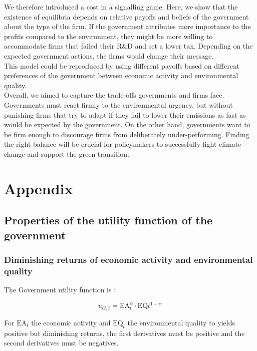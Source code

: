 \documentclass{article}
\begin{document}
We therefore introduced a cost in a signalling game. Here, we show that the existence of equilibria depends on relative payoffs and beliefs of the government about the type of the firm. If the government attributes more importance to the profits compared to the environment, they might be more willing to accommodate firms that failed their R\&D and set a lower tax. Depending on the expected government actions, the firms would change their message.\\

This model could be reproduced by using different payoffs based on different preferences of the government between economic activity and environmental quality. \\

Overall, we aimed to capture the trade-offs governments and firms face. Governments must react firmly to the environmental urgency, but without punishing firms that try to adapt if they fail to lower their emissions as fast as would be expected by the government. On the other hand, governments want to be firm enough to discourage firms from deliberately under-performing. Finding the right balance will be crucial for policymakers to successfully fight climate change and support the green transition.

\pagebreak
\section{Appendix}

\subsection{Properties of the utility function of the government}

\subsubsection{Diminishing returns of economic activity and environmental quality}
\label{sec:properties_utility_function_gov_1}
The Government utility function is :

\begin{equation}\tag{4}
    u_{G,t}=\text{EA}_{t}^{\alpha}\cdot\text{EQ}{t}^{1-\alpha}
\end{equation}

For $\text{EA}_{t}$ the economic activity and $\text{EQ}_{t}$ the environmental quality to yields positive but diminishing returns, the first derivatives must be positive and the second derivatives must be negatives. 
\end{document}
